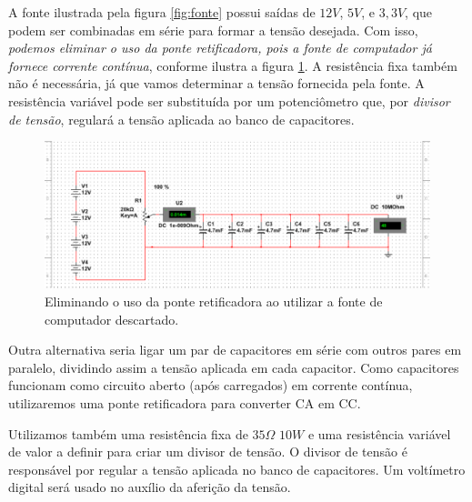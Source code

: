 \documentclass[
	12pt,				%
	openright,			%
	oneside,			%
	a4paper,			%
	english,			%
	spanish,			%
	brazil,				%
	]{abntex2}
\begin{document}
A fonte ilustrada pela figura \ref{fig:fonte} possui saídas de $12V$, $5V$, e $3,3V$, que podem ser combinadas em série para formar a tensão desejada. Com isso, \textit{podemos eliminar o uso da ponte retificadora, pois a fonte de computador já fornece corrente contínua}, conforme ilustra a figura \ref{fig:simulacao2}. A resistência fixa também não é necessária, já que vamos determinar a tensão fornecida pela fonte. A resistência variável pode ser substituída por um potenciômetro que, por \textit{divisor de tensão}, regulará a tensão aplicada ao banco de capacitores.
%
\begin{figure}[H]
	\centering
	\includegraphics[scale=0.5]{figuras/simulacao2.pdf}
	\caption{Eliminando o uso da ponte retificadora ao utilizar a fonte de computador descartado.}  \label{fig:simulacao2} 
\end{figure}

Outra alternativa seria ligar um par de capacitores em série com outros pares em paralelo, dividindo assim a tensão aplicada em cada capacitor.
Como capacitores funcionam como circuito aberto (após carregados) em corrente contínua, utilizaremos uma ponte retificadora para converter CA em CC.

Utilizamos também uma resistência fixa de $35 \Omega$ $10 W$ e uma resistência variável de valor a definir para criar um divisor de tensão. O divisor de tensão é responsável por regular a tensão aplicada no banco de capacitores. Um voltímetro digital será usado no auxílio da aferição da tensão. 
\end{document}
